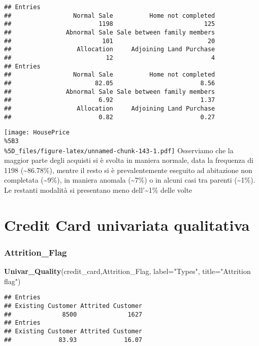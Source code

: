 \documentclass[
]{article}
\newenvironment{Shaded}{\begin{snugshade}}{\end{snugshade}}
\newcommand{\AttributeTok}[1]{\textcolor[rgb]{0.13,0.29,0.53}{#1}}
\newcommand{\FunctionTok}[1]{\textcolor[rgb]{0.13,0.29,0.53}{\textbf{#1}}}
\newcommand{\NormalTok}[1]{#1}
\newcommand{\StringTok}[1]{\textcolor[rgb]{0.31,0.60,0.02}{#1}}
\begin{document}
\begin{verbatim}
## Entries
##                 Normal Sale          Home not completed 
##                        1198                         125 
##               Abnormal Sale Sale between family members 
##                         101                          20 
##                  Allocation     Adjoining Land Purchase 
##                          12                           4 
## Entries
##                 Normal Sale          Home not completed 
##                       82.05                        8.56 
##               Abnormal Sale Sale between family members 
##                        6.92                        1.37 
##                  Allocation     Adjoining Land Purchase 
##                        0.82                        0.27
\end{verbatim}

\texttt{[image: HousePrice\\\%5B3\\\%5D\_files/figure-latex/unnamed-chunk-143-1.pdf]}
Osserviamo che la maggior parte degli acquisti si è svolta in maniera
normale, data la frequenza di 1198 (\textasciitilde86.78\%), mentre il
resto si è prevalentemente eseguito ad abitazione non completata
(\textasciitilde9\%), in maniera anomala (\textasciitilde7\%) o in
alcuni casi tra parenti (\textasciitilde1\%). Le restanti modalità si
presentano meno dell'\textasciitilde1\% delle volte

\section{Credit Card univariata
qualitativa}\label{credit-card-univariata-qualitativa}

\subsubsection{Attrition\_Flag}\label{attrition_flag}

\begin{Shaded}
\begin{Highlighting}[]
\FunctionTok{Univar\_Quality}\NormalTok{(credit\_card,Attrition\_Flag,}
               \AttributeTok{label=}\StringTok{"Types"}\NormalTok{,}
               \AttributeTok{title=}\StringTok{"Attrition flag"}\NormalTok{)}
\end{Highlighting}
\end{Shaded}

\begin{verbatim}
## Entries
## Existing Customer Attrited Customer 
##              8500              1627 
## Entries
## Existing Customer Attrited Customer 
##             83.93             16.07
\end{verbatim}
\end{document}
